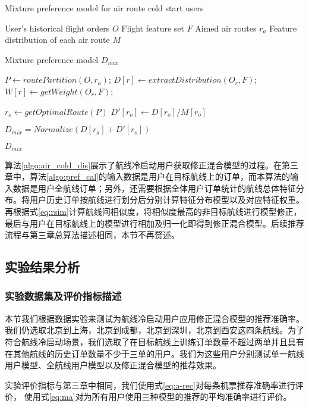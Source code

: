 \begin{algorithm}
\caption{Mixture preference model for air route cold start users}
\label{algo:air_cold_dis}
\begin{algorithmic}[1]
\Require
\Statex User's historical flight orders $O$
\Statex Flight feature set $F$
\Statex Aimed air routes $r_a$
\Statex Feature distribution of each air route $M$

\Ensure 
\Statex Mixture preference model $D_{mix}$

\State $P \gets routePartition(O,r_a)$;
\State $D[r] \gets extractDistribution(O_r,F)$;
\State $W[r] \gets getWeight(O_r,F)$;
\EndFor

\State $r_o \gets getOptimalRoute(P)$
\State $D'[r_o] \gets D[r_o] / M[r_o]$

\State $D_{mix} = Normalize(D[r_a] + D'[r_o])$

\State \Return $D_{mix}$
\end{algorithmic}
\end{algorithm}

算法\ref{algo:air_cold_dis}展示了航线冷启动用户获取修正混合模型的过程。在第三章中，算法\ref{algo:pref_cal}的输入数据是用户在目标航线上的订单，而本算法的输入数据是用户全航线订单；另外，还需要根据全体用户订单统计的航线总体特征分布。将用户历史订单按航线进行划分后分别计算特征分布模型以及对应特征权重。再根据式\ref{eq:rsim}计算航线间相似度，将相似度最高的非目标航线进行模型修正，最后与用户在目标航线上的模型进行相加及归一化即得到修正混合模型。后续推荐流程与第三章总算法描述相同，本节不再赘述。

\subsection{实验结果分析}

\subsubsection{实验数据集及评价指标描述}

本节我们根据数据实验来测试为航线冷启动用户应用修正混合模型的推荐准确率。
我们仍选取北京到上海，北京到成都，北京到深圳，北京到西安这四条航线。为了符合航线冷启动场景，我们选取了在目标航线上训练订单数量不超过两单并且具有在其他航线的历史订单数量不少于三单的用户。我们为这些用户分别测试单一航线用户模型、全航线用户模型以及修正混合模型的推荐效果。

实验评价指标与第三章中相同，我们使用式\ref{eq:a-rec}对每条机票推荐准确率进行评价，
使用式\ref{eq:ma}对为所有用户使用三种模型的推荐的平均准确率进行评价。

